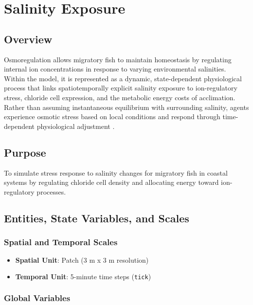 \documentclass[
]{book}
\providecommand{\tightlist}{%
  \setlength{\itemsep}{0pt}\setlength{\parskip}{0pt}}
\begin{document}
\chapter{Salinity Exposure}\label{salinity-exposure}

\section{Overview}\label{overview-2}

Osmoregulation allows migratory fish to maintain homeostasis by regulating internal ion concentrations in response to varying environmental salinities. Within the model, it is represented as a dynamic, state-dependent physiological process that links spatiotemporally explicit salinity exposure to ion-regulatory stress, chloride cell expression, and the metabolic energy costs of acclimation. Rather than assuming instantaneous equilibrium with surrounding salinity, agents experience osmotic stress based on local conditions and respond through time-dependent physiological adjustment \citep{evans_osmotic_2008}.

\section{Purpose}\label{purpose-2}

To simulate stress response to salinity changes for migratory fish in coastal systems by regulating chloride cell density and allocating energy toward ion-regulatory processes.

\section{Entities, State Variables, and Scales}\label{entities-state-variables-and-scales-2}

\subsection{Spatial and Temporal Scales}\label{spatial-and-temporal-scales-2}

\begin{itemize}
\tightlist
\item
  \textbf{Spatial Unit}: Patch (3 m x 3 m resolution)
\item
  \textbf{Temporal Unit}: 5-minute time steps (\texttt{tick})
\end{itemize}

\subsection{Global Variables}\label{global-variables-2}
\end{document}
